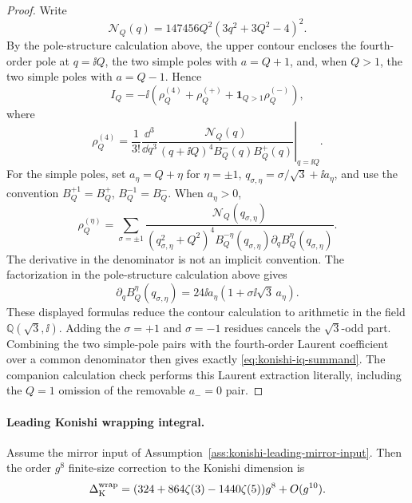 \begin{proof}
Write
\[
  \mathcal N_Q(q)=147456Q^2(3q^2+3Q^2-4)^2 .
\]
By the pole-structure calculation above, the upper contour encloses
the fourth-order pole at \(q=\ii Q\), the two simple poles with
\(a=Q+1\), and, when \(Q>1\), the two simple poles with \(a=Q-1\).  Hence
\[
  I_Q
  =
  -\ii\left(
    \rho_Q^{(4)}+\rho_Q^{(+)}+\mathbf 1_{Q>1}\rho_Q^{(-)}
  \right),
\]
where
\[
  \rho_Q^{(4)}
  =
  \frac1{3!}
  \left.
  \frac{\dd^3}{\dd q^3}
  \frac{\mathcal N_Q(q)}
       {(q+\ii Q)^4B_Q^-(q)B_Q^+(q)}
  \right|_{q=\ii Q}.
\]
For the simple poles, set \(a_\eta=Q+\eta\) for
\(\eta=\pm1\), \(q_{\sigma,\eta}=\sigma/\sqrt3+\ii a_\eta\), and use the
convention \(B_Q^{+1}=B_Q^+\), \(B_Q^{-1}=B_Q^-\).  When \(a_\eta>0\),
\[
  \rho_Q^{(\eta)}
  =
  \sum_{\sigma=\pm1}
  \frac{\mathcal N_Q(q_{\sigma,\eta})}
       {(q_{\sigma,\eta}^2+Q^2)^4
        B_Q^{-\eta}(q_{\sigma,\eta})
        \partial_q B_Q^\eta(q_{\sigma,\eta})}.
\]
The derivative in the denominator is not an implicit convention.  The
factorization in the pole-structure calculation above gives
\[
  \partial_qB_Q^\eta(q_{\sigma,\eta})
  =
  24\ii a_\eta(1+\sigma\ii\sqrt3\,a_\eta).
\]
These displayed formulas reduce the contour calculation to arithmetic in the
field \(\mathbb Q(\sqrt3,\ii)\).  Adding the \(\sigma=+1\) and \(\sigma=-1\)
residues cancels the \(\sqrt3\)-odd part.  Combining the two simple-pole
pairs with the fourth-order Laurent coefficient over a common denominator
then gives exactly \eqref{eq:konishi-iq-summand}.  The companion calculation
check performs this Laurent extraction literally, including the \(Q=1\)
omission of the removable \(a_{-}=0\) pair.
\end{proof}

\paragraph{Leading Konishi wrapping integral.}
\label{par:konishi-leading-wrapping-integral}
Assume the mirror input of
Assumption~\ref{ass:konishi-leading-mirror-input}.  Then the order \(g^8\)
finite-size correction to the Konishi dimension is
\[
  \Delta_{\rm K}^{\rm wrap}
  =
  (324+864\zeta(3)-1440\zeta(5))g^8+O(g^{10}).
\]

